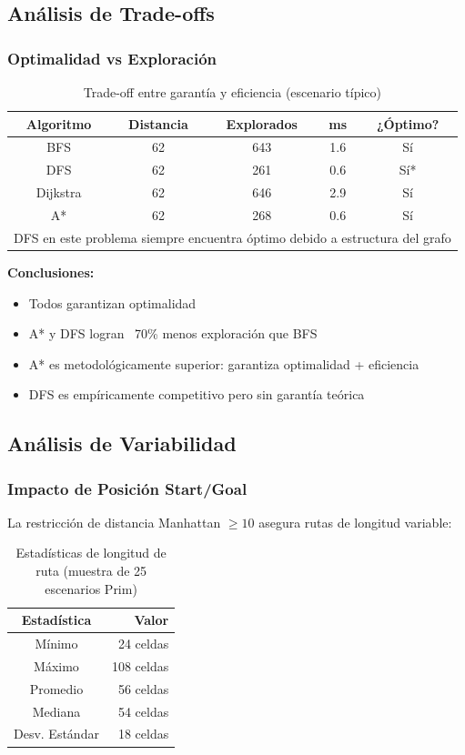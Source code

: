 \documentclass[12pt,a4paper]{article}
\begin{document}
\subsection{Análisis de Trade-offs}

\subsubsection{Optimalidad vs Exploración}

\begin{table}[H]
\centering
\caption{Trade-off entre garantía y eficiencia (escenario típico)}
\begin{tabular}{|c|c|c|c|c|}
\hline
\textbf{Algoritmo} & \textbf{Distancia} & \textbf{Explorados} & \textbf{ms} & \textbf{¿Óptimo?} \\
\hline
BFS & 62 & 643 & 1.6 & Sí \\
\hline
DFS & 62 & 261 & 0.6 & Sí* \\
\hline
Dijkstra & 62 & 646 & 2.9 & Sí \\
\hline
A* & 62 & 268 & 0.6 & Sí \\
\hline
\multicolumn{5}{l}{\small *DFS en este problema siempre encuentra óptimo debido a estructura del grafo}
\end{tabular}
\end{table}

\textbf{Conclusiones:}
\begin{itemize}
    \item Todos garantizan optimalidad
    \item A* y DFS logran ~70\% menos exploración que BFS
    \item A* es metodológicamente superior: garantiza optimalidad + eficiencia
    \item DFS es empíricamente competitivo pero sin garantía teórica
\end{itemize}

\subsection{Análisis de Variabilidad}

\subsubsection{Impacto de Posición Start/Goal}

La restricción de distancia Manhattan $\geq 10$ asegura rutas de longitud variable:

\begin{table}[H]
\centering
\caption{Estadísticas de longitud de ruta (muestra de 25 escenarios Prim)}
\begin{tabular}{|c|r|}
\hline
\textbf{Estadística} & \textbf{Valor} \\
\hline
Mínimo & 24 celdas \\
\hline
Máximo & 108 celdas \\
\hline
Promedio & 56 celdas \\
\hline
Mediana & 54 celdas \\
\hline
Desv. Estándar & 18 celdas \\
\hline
\end{tabular}
\end{table}
\end{document}
